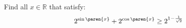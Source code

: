 Find all $x \in \mathbb{R}$ that satisfy:
\begin{equation*}
  2^{\sin\paren{x}} + 2^{\cos\paren{x}}
  \geq
  2^{1 - \frac{1}{\sqrt{2}}}
\end{equation*}
